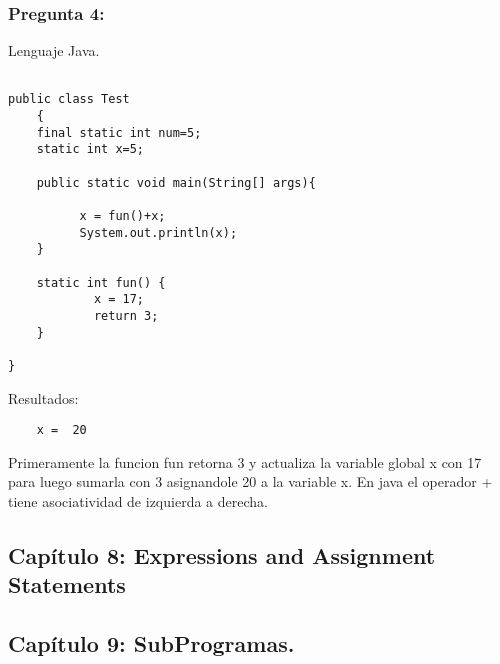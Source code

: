 \documentclass[11pt]{article}
\begin{document}
\subsubsection{Pregunta 4:}

Lenguaje Java.

\begin{lstlisting}[frame=single] 

public class Test
    {
    final static int num=5;
    static int x=5;
   
    public static void main(String[] args){
        
          x = fun()+x; 
          System.out.println(x); 
    }

    static int fun() {
            x = 17;
            return 3;
    }

}
\end{lstlisting}

\noindent Resultados:
\begin{verbatim}
	x =  20
\end{verbatim}

Primeramente la funcion fun retorna 3 y actualiza la variable global x con 17 para luego sumarla con 3 asignandole 20 a la variable x.
En java el operador + tiene asociatividad de izquierda a derecha.

\subsection{Capítulo 8: Expressions and Assignment Statements}

\subsection{Capítulo 9: SubProgramas.}


        
\end{document}
